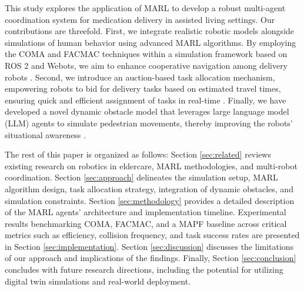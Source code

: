 \documentclass[conference]{IEEEtran}
\begin{document}
This study explores the application of MARL to develop a robust multi-agent coordination system for medication delivery in assisted living settings. Our contributions are threefold. First, we integrate realistic robotic models alongside simulations of human behavior using advanced MARL algorithms. By employing the COMA and FACMAC techniques within a simulation framework based on ROS 2 and Webots, we aim to enhance cooperative navigation among delivery robots \citep{salinas2023}. Second, we introduce an auction-based task allocation mechanism, empowering robots to bid for delivery tasks based on estimated travel times, ensuring quick and efficient assignment of tasks in real-time \citep{kayy2017}. Finally, we have developed a novel dynamic obstacle model that leverages large language model (LLM) agents to simulate pedestrian movements, thereby improving the robots' situational awareness \citep{rostumi2019}.

The rest of this paper is organized as follows: Section \ref{sec:related} reviews existing research on robotics in eldercare, MARL methodologies, and multi-robot coordination. Section \ref{sec:approach} delineates the simulation setup, MARL algorithm design, task allocation strategy, integration of dynamic obstacles, and simulation constraints. Section \ref{sec:methodology} provides a detailed description of the MARL agents' architecture and implementation timeline. Experimental results benchmarking COMA, FACMAC, and a MAPF baseline across critical metrics such as efficiency, collision frequency, and task success rates are presented in Section \ref{sec:implementation}. Section \ref{sec:discussion} discusses the limitations of our approach and implications of the findings. Finally, Section \ref{sec:conclusion} concludes with future research directions, including the potential for utilizing digital twin simulations and real-world deployment.
\end{document}
